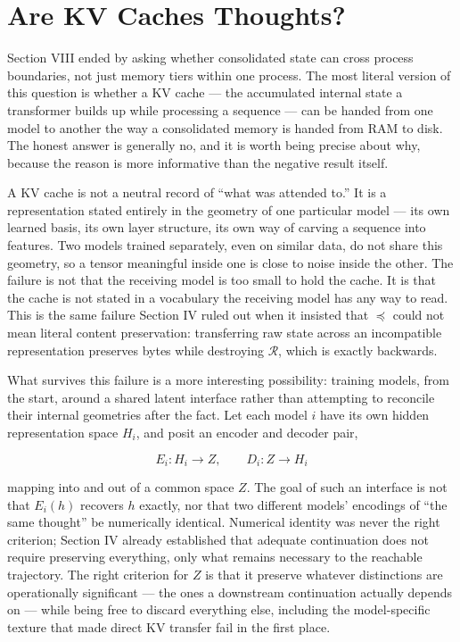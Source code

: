 \documentclass[11pt]{article}
\begin{document}
\section{Are KV Caches Thoughts?}

Section VIII ended by asking whether consolidated state can cross process boundaries, not just memory tiers within one process. The most literal version of this question is whether a KV cache --- the accumulated internal state a transformer builds up while processing a sequence --- can be handed from one model to another the way a consolidated memory is handed from RAM to disk. The honest answer is generally no, and it is worth being precise about why, because the reason is more informative than the negative result itself.

A KV cache is not a neutral record of ``what was attended to.'' It is a representation stated entirely in the geometry of one particular model --- its own learned basis, its own layer structure, its own way of carving a sequence into features. Two models trained separately, even on similar data, do not share this geometry, so a tensor meaningful inside one is close to noise inside the other. The failure is not that the receiving model is too small to hold the cache. It is that the cache is not stated in a vocabulary the receiving model has any way to read. This is the same failure Section IV ruled out when it insisted that $\preceq$ could not mean literal content preservation: transferring raw state across an incompatible representation preserves bytes while destroying $\mathcal{R}$, which is exactly backwards.

What survives this failure is a more interesting possibility: training models, from the start, around a shared latent interface rather than attempting to reconcile their internal geometries after the fact. Let each model $i$ have its own hidden representation space $H_i$, and posit an encoder and decoder pair,

\[
E_i : H_i \to Z, \qquad D_i : Z \to H_i
\]

mapping into and out of a common space $Z$. The goal of such an interface is not that $E_i(h)$ recovers $h$ exactly, nor that two different models' encodings of ``the same thought'' be numerically identical. Numerical identity was never the right criterion; Section IV already established that adequate continuation does not require preserving everything, only what remains necessary to the reachable trajectory. The right criterion for $Z$ is that it preserve whatever distinctions are operationally significant --- the ones a downstream continuation actually depends on --- while being free to discard everything else, including the model-specific texture that made direct KV transfer fail in the first place.
\end{document}
